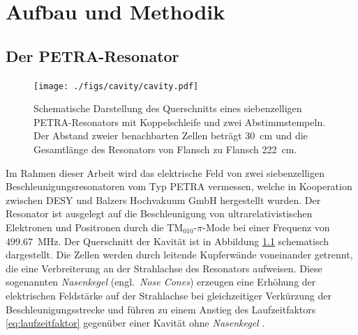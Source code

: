 \chapter{Aufbau und Methodik}
\label{sec:aufbau_und_methodik}

\section{Der PETRA-Resonator}
\label{sec:petra_resonator}
\begin{figure}[htb]
  \centering
  \texttt{[image: ./figs/cavity/cavity.pdf]}
  \caption[Schematische Darstellung des Querschnitts eines siebenzelligen PETRA-Resonators mit Koppelschleife und zwei Abstimmstempeln]{Schematische Darstellung des Querschnitts eines siebenzelligen PETRA-Resonators mit Koppelschleife und zwei Abstimmstempeln. Der Abstand zweier benachbarten Zellen beträgt \SI{30}{\centi\metre} und die Gesamtlänge des Resonators von Flansch zu Flansch \SI{222}{\centi\metre}.}
  \label{fig:petra_cavity}
\end{figure}
Im Rahmen dieser Arbeit wird das elektrische Feld von zwei siebenzelligen Beschleunigungsresonatoren vom Typ PETRA \cite{desy_petra} vermessen, welche in Kooperation zwischen DESY und Balzers Hochvakuum GmbH hergestellt wurden.
Der Resonator ist ausgelegt auf die Beschleunigung von ultrarelativistischen Elektronen und Positronen durch die $\mathrm{TM}_{010}\text{-}\pi$-Mode bei einer Frequenz von \SI{499.67}{MHz}.
Der Querschnitt der Kavität ist in Abbildung \ref{fig:petra_cavity} schematisch dargestellt.
Die Zellen werden durch leitende Kupferwände voneinander getrennt, die eine Verbreiterung an der Strahlachse des Resonators aufweisen.
Diese sogenannten \textit{Nasenkegel} (engl.\ \textit{Nose Cones}) erzeugen eine Erhöhung der elektrischen Feldstärke auf der Strahlachse bei gleichzeitiger Verkürzung der Beschleunigungsstrecke und führen zu einem Anstieg des Laufzeitfaktors \eqref{eq:laufzeitfaktor} gegenüber einer Kavität ohne \textit{Nasenkegel} \cite[S.\ 48]{wangler}.

